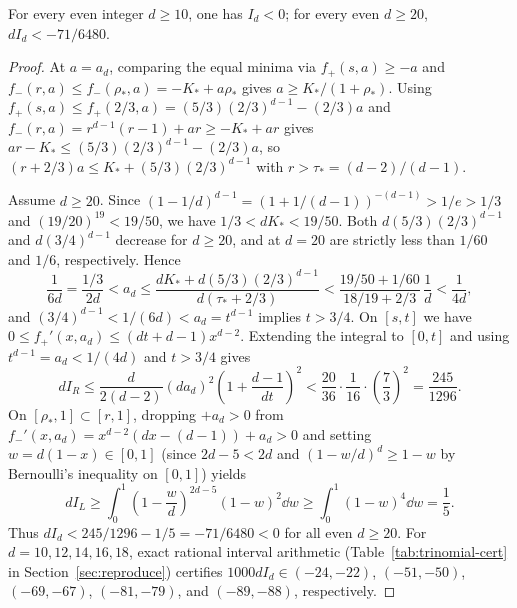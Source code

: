 \begin{lemma}\label{lem:trinomial-Id}
For every even integer $d\ge 10$, one has $I_d<0$; for every even $d\ge 20$, $d I_d < -71/6480$.
\end{lemma}

\begin{proof}
At $a=a_d$, comparing the equal minima via $f_+(s,a)\ge -a$ and $f_-(r,a)\le
f_-(\rho_*,a)=-K_*+a\rho_*$ gives $a\ge K_*/(1+\rho_*)$. Using $f_+(s,a)\le
f_+(2/3,a)=(5/3)(2/3)^{d-1}-(2/3)a$ and $f_-(r,a)=r^{d-1}(r-1)+ar\ge -K_*+ar$ gives $ar-K_*\le
(5/3)(2/3)^{d-1}-(2/3)a$, so $(r+2/3)a\le K_*+(5/3)(2/3)^{d-1}$ with $r>\tau_*=(d-2)/(d-1)$.

Assume $d\ge 20$. Since $(1-1/d)^{d-1}=(1+1/(d-1))^{-(d-1)}>1/e>1/3$ and $(19/20)^{19}<19/50$, we have
$1/3<dK_*<19/50$. Both $d(5/3)(2/3)^{d-1}$ and $d(3/4)^{d-1}$ decrease for $d\ge 20$, and at $d=20$
are strictly less than $1/60$ and $1/6$, respectively. Hence
\[
  \frac{1}{6d} = \frac{1/3}{2d} < a_d \le \frac{dK_* + d(5/3)(2/3)^{d-1}}{d(\tau_* + 2/3)} <
  \frac{19/50 + 1/60}{18/19 + 2/3}\,\frac{1}{d} < \frac{1}{4d},
\]
and $(3/4)^{d-1}<1/(6d)<a_d=t^{d-1}$ implies $t>3/4$. On $[s,t]$ we have $0\le f_+'(x,a_d)\le
(dt+d-1)x^{d-2}$. Extending the integral to $[0,t]$ and using $t^{d-1}=a_d<1/(4d)$ and $t>3/4$ gives
\[
  d I_R \le \frac{d}{2(d-2)}(da_d)^2\left(1+\frac{d-1}{dt}\right)^2 <
  \frac{20}{36}\cdot\frac{1}{16}\cdot\left(\frac{7}{3}\right)^2 = \frac{245}{1296}.
\]
On $[\rho_*,1]\subset[r,1]$, dropping $+a_d>0$ from $f_-'(x,a_d)=x^{d-2}(dx-(d-1))+a_d>0$ and setting
$w=d(1-x)\in[0,1]$ (since $2d-5<2d$ and $(1-w/d)^d\ge 1-w$ by Bernoulli's inequality on $[0,1]$)
yields
\[
  d I_L \ge \int_0^1 \left(1-\frac{w}{d}\right)^{2d-5}(1-w)^2\dd w \ge \int_0^1 (1-w)^4\dd w = \frac{1}{5}.
\]
Thus $dI_d < 245/1296 - 1/5 = -71/6480 < 0$ for all even $d\ge 20$. For $d=10,12,14,16,18$, exact
rational interval arithmetic (Table~\ref{tab:trinomial-cert} in Section~\ref{sec:reproduce}) certifies
$1000dI_d\in(-24,-22)$, $(-51,-50)$, $(-69,-67)$, $(-81,-79)$, and $(-89,-88)$, respectively.
\end{proof}

